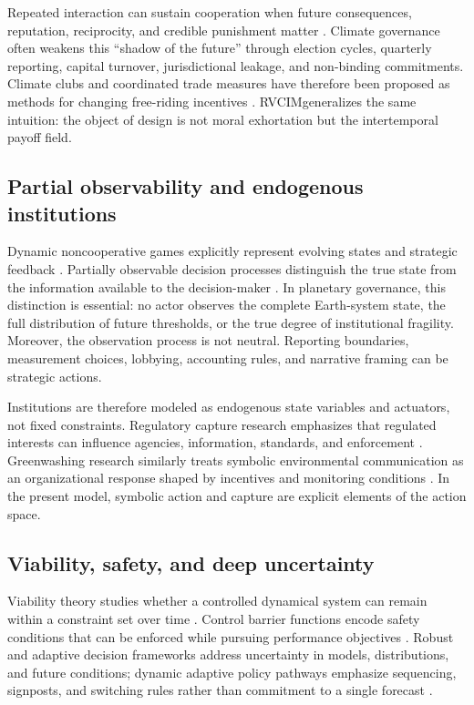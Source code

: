 \documentclass[11pt,a4paper]{article}
\numberwithin{equation}{section}
\theoremstyle{definition}
\theoremstyle{plain}
\theoremstyle{remark}
\newcommand{\RVCIM}{\textsc{RVCIM}}
\begin{document}
Repeated interaction can sustain cooperation when future consequences, reputation, reciprocity, and credible punishment matter \citep{axelrod1984,ostrom1990}. Climate governance often weakens this ``shadow of the future'' through election cycles, quarterly reporting, capital turnover, jurisdictional leakage, and non-binding commitments. Climate clubs and coordinated trade measures have therefore been proposed as methods for changing free-riding incentives \citep{nordhaus2015}. \RVCIM generalizes the same intuition: the object of design is not moral exhortation but the intertemporal payoff field.

\subsection{Partial observability and endogenous institutions}

Dynamic noncooperative games explicitly represent evolving states and strategic feedback \citep{basar1999}. Partially observable decision processes distinguish the true state from the information available to the decision-maker \citep{kaelbling1998}. In planetary governance, this distinction is essential: no actor observes the complete Earth-system state, the full distribution of future thresholds, or the true degree of institutional fragility. Moreover, the observation process is not neutral. Reporting boundaries, measurement choices, lobbying, accounting rules, and narrative framing can be strategic actions.

Institutions are therefore modeled as endogenous state variables and actuators, not fixed constraints. Regulatory capture research emphasizes that regulated interests can influence agencies, information, standards, and enforcement \citep{carpentermoss2014}. Greenwashing research similarly treats symbolic environmental communication as an organizational response shaped by incentives and monitoring conditions \citep{delmasburbano2011}. In the present model, symbolic action and capture are explicit elements of the action space.

\subsection{Viability, safety, and deep uncertainty}

Viability theory studies whether a controlled dynamical system can remain within a constraint set over time \citep{aubin2011}. Control barrier functions encode safety conditions that can be enforced while pursuing performance objectives \citep{ames2017,ames2019}. Robust and adaptive decision frameworks address uncertainty in models, distributions, and future conditions; dynamic adaptive policy pathways emphasize sequencing, signposts, and switching rules rather than commitment to a single forecast \citep{haasnoot2013,kwakkel2016}.
\end{document}
